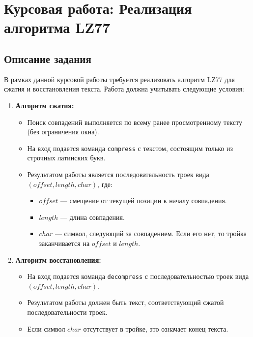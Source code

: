 \section*{Курсовая работа: Реализация алгоритма LZ77}

\subsection*{Описание задания}

В рамках данной курсовой работы требуется реализовать алгоритм LZ77 для сжатия и восстановления текста. Работа должна учитывать следующие условия:

\begin{enumerate}
  \item \textbf{Алгоритм сжатия:}
  \begin{itemize}
    \item Поиск совпадений выполняется по всему ранее просмотренному тексту (без ограничения окна).
    \item На вход подается команда \texttt{compress} с текстом, состоящим только из строчных латинских букв.
    \item Результатом работы является последовательность троек вида $(offset, length, char)$, где:
    \begin{itemize}
      \item $offset$ --- смещение от текущей позиции к началу совпадения.
      \item $length$ --- длина совпадения.
      \item $char$ --- символ, следующий за совпадением. Если его нет, то тройка заканчивается на $offset$ и $length$.
    \end{itemize}
  \end{itemize}

  \item \textbf{Алгоритм восстановления:}
  \begin{itemize}
    \item На вход подается команда \texttt{decompress} с последовательностью троек вида $(offset, length, char)$.
    \item Результатом работы должен быть текст, соответствующий сжатой последовательности троек.
    \item Если символ $char$ отсутствует в тройке, это означает конец текста.
  \end{itemize}


\end{enumerate}
